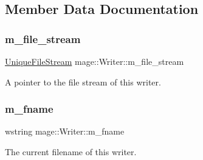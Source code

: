 \subsection{Member Data Documentation}
\hypertarget{classmage_1_1_writer_ac4884215d1b547e990633474bf61c470}{}\label{classmage_1_1_writer_ac4884215d1b547e990633474bf61c470} 
\subsubsection{\texorpdfstring{m\+\_\+file\+\_\+stream}{m\_file\_stream}}
{\footnotesize\ttfamily \hyperlink{namespacemage_a0ee1bd45ad7dbb3dc8c8e1770e3538d4}{Unique\+File\+Stream} mage\+::\+Writer\+::m\+\_\+file\+\_\+stream\hspace{0.3cm}{\ttfamily [private]}}

A pointer to the file stream of this writer. \hypertarget{classmage_1_1_writer_afa271ee47897d4961e9d62132d8faeb5}{}\label{classmage_1_1_writer_afa271ee47897d4961e9d62132d8faeb5} 
\subsubsection{\texorpdfstring{m\+\_\+fname}{m\_fname}}
{\footnotesize\ttfamily wstring mage\+::\+Writer\+::m\+\_\+fname\hspace{0.3cm}{\ttfamily [private]}}

The current filename of this writer. 